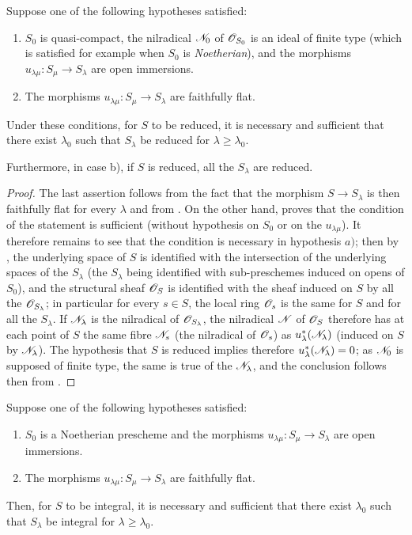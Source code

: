 \begin{proposition}[8.7.2]
\label{IV.8.7.2}
Suppose \textup{one} of the following hypotheses satisfied:
\begin{enumerate}[label=\emph{\alph*)}]
\item $S_0$ is quasi-compact, the nilradical $\mathscr{N}_0$ of $\mathscr{O}_{S_0}$ is an ideal of finite type \textup{(which is satisfied for example when $S_0$ is \emph{Noetherian})}, and the morphisms $u_{\lambda\mu}:S_\mu\to S_\lambda$ are open immersions.
\item The morphisms $u_{\lambda\mu}:S_\mu\to S_\lambda$ are faithfully flat.
\end{enumerate}
Under these conditions, for $S$ to be reduced, it is necessary and sufficient that there exist $\lambda_0$ such that $S_\lambda$ be reduced for $\lambda\geqslant\lambda_0$.

Furthermore, in case b), if $S$ is reduced, all the $S_\lambda$ are reduced.
\end{proposition}

\begin{proof}
The last assertion follows from the fact that the morphism $S\to S_\lambda$ is then faithfully flat for every $\lambda$  and from .
On the other hand,  proves that the condition of the statement is sufficient (without hypothesis on $S_0$ or on the $u_{\lambda\mu}$).
It therefore remains to see that the condition is necessary in hypothesis $a)$; then by , the underlying space of $S$ is identified with the intersection of the underlying spaces of the $S_\lambda$ (the $S_\lambda$ being identified with sub-preschemes induced on opens of $S_0$), and the structural sheaf $\mathscr{O}_S$ is identified with
the sheaf induced on $S$ by all the $\mathscr{O}_{S_\lambda}$; in particular for every $s\in S$, the local ring $\mathscr{O}_s$ is the same for $S$ and for all the $S_\lambda$.
If $\mathscr{N}_\lambda$ is the nilradical of $\mathscr{O}_{S_\lambda}$, the nilradical $\mathscr{N}$ of $\mathscr{O}_S$ therefore has at each point of $S$ the same fibre $\mathscr{N}_s$ (the nilradical of $\mathscr{O}_s$) as $u_\lambda^*(\mathscr{N}_\lambda)$ (induced on $S$ by $\mathscr{N}_\lambda$).
The hypothesis that $S$ is reduced implies therefore $u_\lambda^*(\mathscr{N}_\lambda)=0$; as $\mathscr{N}_0$ is supposed of finite type, the same is true of the $\mathscr{N}_\lambda$, and the conclusion follows then from .
\end{proof}

\begin{corollary}[8.7.3]
\label{IV.8.7.3}
Suppose \textup{one} of the following hypotheses satisfied:
\begin{enumerate}[label=\emph{\alph*)}]
\item $S_0$ is a Noetherian prescheme and the morphisms $u_{\lambda\mu}:S_\mu\to S_\lambda$ are open immersions.
\item The morphisms $u_{\lambda\mu}:S_\mu\to S_\lambda$ are faithfully flat.
\end{enumerate}
Then, for $S$ to be integral, it is necessary and sufficient that there exist $\lambda_0$ such that $S_\lambda$ be integral for $\lambda\geqslant\lambda_0$.
\end{corollary}

